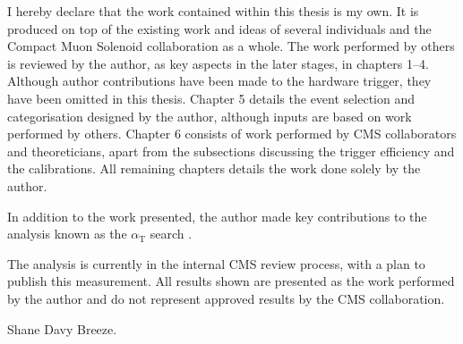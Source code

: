 \begin{declaration}%
%
I hereby declare that the work contained within this thesis is my own. It is produced on top of the existing work and ideas of several individuals and the Compact Muon Solenoid collaboration as a whole. The work performed by others is reviewed by the author, as key aspects in the later stages, in chapters 1--4. Although author contributions have been made to the hardware trigger, they have been omitted in this thesis. Chapter 5 details the event selection and categorisation designed by the author, although inputs are based on work performed by others. Chapter 6 consists of work performed by CMS collaborators and theoreticians, apart from the subsections discussing the \ptmiss trigger efficiency and the \ptmiss calibrations. All remaining chapters details the work done solely by the author.

In addition to the work presented, the author made key contributions to the analysis known as the $\alpha_{\mathrm{T}}$ search \cite{Sirunyan:2018vjp}.

The analysis is currently in the internal CMS review process, with a plan to publish this measurement. All results shown are presented as the work performed by the author and do not represent approved results by the CMS collaboration.

\mbox{}\hfill Shane Davy Breeze.
%
\end{declaration}%
